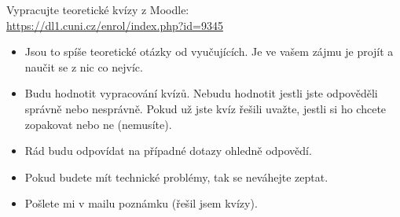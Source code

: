 Vypracujte teoretické kvízy z Moodle: \\
\url{https://dl1.cuni.cz/enrol/index.php?id=9345}

\begin{itemize}

	\item  Jsou to spíše teoretické otázky od vyučujících.
		Je ve vašem zájmu je projít a naučit se z nic co nejvíc.

	\item  Budu hodnotit vypracování kvízů.
		Nebudu hodnotit jestli jste odpověděli správně nebo nesprávně.
		Pokud už jste kvíz řešili uvažte, jestli si ho chcete zopakovat nebo ne (nemusíte).

	\item  Rád budu odpovídat na případné dotazy ohledně odpovědí.

	\item  Pokud budete mít technické problémy, tak se neváhejte zeptat.

	\item  Pošlete mi v mailu poznámku (řešil jsem kvízy).

\end{itemize}

